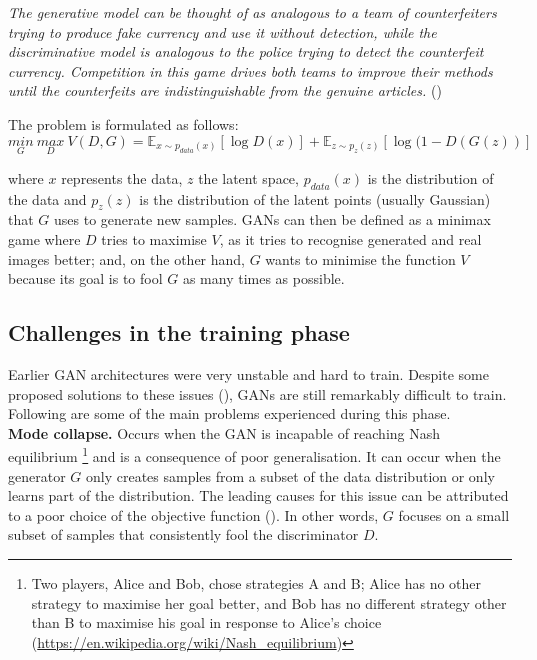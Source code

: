 \noindent\textit{The generative model can be thought of as analogous to a team of counterfeiters trying to produce fake currency and use it without detection, while the discriminative model is analogous to the police trying to detect the counterfeit currency. Competition in this game drives both teams to improve their methods until the counterfeits are indistinguishable from the genuine articles.} (\cite{goodfellow.etal_GenerativeAdversarialNets_})

The problem is formulated as follows:
\begin{equation}
    \underset{G}{min}\ \underset{D}{max}\ V(D,G) = \mathbb{E}_{x \sim p_{data}(x)}[\log D(x)] + \mathbb{E}_{z \sim p_z(z)}[\log(1 - D(G(z))]
    \label{eq:gan_min_max}
 \end{equation}

 \noindent where $x$ represents the data, $z$ the latent space,  $p_{data}(x)$ is the distribution of the data and $p_z(z)$ is the distribution of the latent points (usually Gaussian) that $G$ uses to generate new samples. GANs can then be defined as a minimax game where $D$ tries to maximise $V$, as it tries to recognise generated and real images better; and, on the other hand, $G$ wants to minimise the function $V$ because its goal is to fool $G$ as many times as possible. 


\subsection{Challenges in the training phase}
Earlier GAN architectures were very unstable and hard to train. Despite some proposed solutions to these issues (\cite{radford.etal_UnsupervisedRepresentationLearning_2016,arjovsky.etal_WassersteinGenerativeAdversarial_}), GANs are still remarkably difficult to train. Following are some of the main problems experienced during this phase.\\

\noindent\textbf{Mode collapse.} Occurs when the GAN is incapable of reaching Nash equilibrium \footnote{Two players, Alice and Bob, chose strategies A and B; Alice has no other strategy to maximise her goal better, and Bob has no different strategy other than B to maximise his goal in response to Alice's choice (\url{https://en.wikipedia.org/wiki/Nash_equilibrium})} and is a consequence of poor generalisation. It can occur when the generator $G$ only creates samples from a subset of the data distribution or only learns part of the distribution. The leading causes for this issue can be attributed to a poor choice of the objective function (\cite{saxena.cao_GenerativeAdversarialNetworks_2022}). In other words, $G$ focuses on a small subset of samples that consistently fool the discriminator $D$.\\

